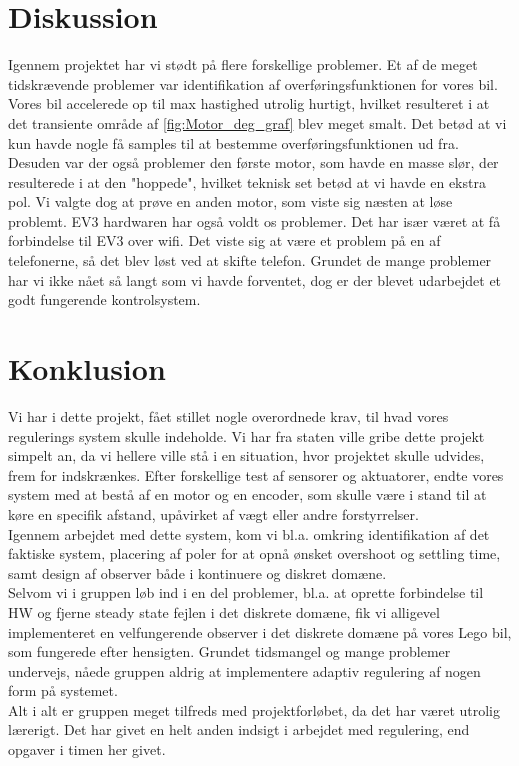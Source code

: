 \graphicspath{{Chapters/Konklussion/}}

\section{Diskussion}
Igennem projektet har vi stødt på flere forskellige problemer. Et af de meget tidskrævende problemer var identifikation af overføringsfunktionen for vores bil. Vores bil accelerede op til max hastighed utrolig hurtigt, hvilket resulteret i at det transiente område af \autoref{fig:Motor_deg_graf} blev meget smalt. Det betød at vi kun havde nogle få samples til at bestemme overføringsfunktionen ud fra. Desuden var der også problemer den første motor, som havde en masse slør, der resulterede i at den "hoppede", hvilket teknisk set betød at vi havde en ekstra pol. Vi valgte dog at prøve en anden motor, som viste sig næsten at løse problemt. 
EV3 hardwaren har også voldt os problemer. Det har især været at få forbindelse til EV3 over wifi. Det viste sig at være et problem på en af telefonerne, så det blev løst ved at skifte telefon.
Grundet de mange problemer har vi ikke nået så langt som vi havde forventet, dog er der blevet udarbejdet et godt fungerende kontrolsystem.

\section{Konklusion}

Vi har i dette projekt, fået stillet nogle overordnede krav, til hvad vores regulerings system skulle indeholde. Vi har fra staten ville gribe dette projekt simpelt an, da vi hellere ville stå i en situation, hvor projektet skulle udvides, frem for indskrænkes. Efter forskellige test af sensorer og aktuatorer, endte vores system med at bestå af en motor og en encoder, som skulle være i stand til at køre en specifik afstand, upåvirket af vægt eller andre forstyrrelser.\\
Igennem arbejdet med dette system, kom vi bl.a. omkring identifikation af det faktiske system, placering af poler for at opnå ønsket overshoot og settling time, samt design af observer både i kontinuere og diskret domæne. \\
Selvom vi i gruppen løb ind i en del problemer, bl.a. at oprette forbindelse til HW og fjerne steady state fejlen i det diskrete domæne, fik vi alligevel implementeret en velfungerende observer i det diskrete domæne på vores Lego bil, som fungerede efter hensigten. Grundet tidsmangel og mange problemer undervejs, nåede gruppen aldrig at implementere adaptiv regulering af nogen form på systemet. \\
Alt i alt er gruppen meget tilfreds med projektforløbet, da det har været utrolig lærerigt. Det har givet en helt anden indsigt i arbejdet med regulering, end opgaver i timen her givet. 




